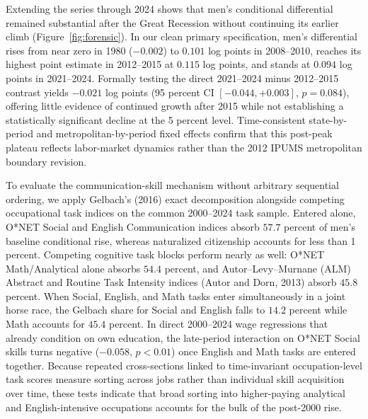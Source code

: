\documentclass[11pt]{article}
\begin{document}
Extending the series through 2024 shows that men's conditional differential remained substantial after the Great Recession without continuing its earlier climb (Figure~\ref{fig:forensic}). In our clean primary specification, men's differential rises from near zero in 1980 ($-0.002$) to $0.101$ log points in 2008--2010, reaches its highest point estimate in 2012--2015 at $0.115$ log points, and stands at $0.094$ log points in 2021--2024. Formally testing the direct 2021--2024 minus 2012--2015 contrast yields $-0.021$ log points (95 percent CI $[-0.044, +0.003]$, $p = 0.084$), offering little evidence of continued growth after 2015 while not establishing a statistically significant decline at the 5 percent level. Time-consistent state-by-period and metropolitan-by-period fixed effects confirm that this post-peak plateau reflects labor-market dynamics rather than the 2012 IPUMS metropolitan boundary revision.

To evaluate the communication-skill mechanism without arbitrary sequential ordering, we apply Gelbach's (2016) exact decomposition alongside competing occupational task indices on the common 2000--2024 task sample. Entered alone, O*NET Social and English Communication indices absorb $57.7$ percent of men's baseline conditional rise, whereas naturalized citizenship accounts for less than 1 percent. Competing cognitive task blocks perform nearly as well: O*NET Math/Analytical alone absorbs $54.4$ percent, and Autor--Levy--Murnane (ALM) Abstract and Routine Task Intensity indices (Autor and Dorn, 2013) absorb $45.8$ percent. When Social, English, and Math tasks enter simultaneously in a joint horse race, the Gelbach share for Social and English falls to $14.2$ percent while Math accounts for $45.4$ percent. In direct 2000--2024 wage regressions that already condition on own education, the late-period interaction on O*NET Social skills turns negative ($-0.058$, $p < 0.01$) once English and Math tasks are entered together. Because repeated cross-sections linked to time-invariant occupation-level task scores measure sorting across jobs rather than individual skill acquisition over time, these tests indicate that broad sorting into higher-paying analytical and English-intensive occupations accounts for the bulk of the post-2000 rise.
\end{document}
